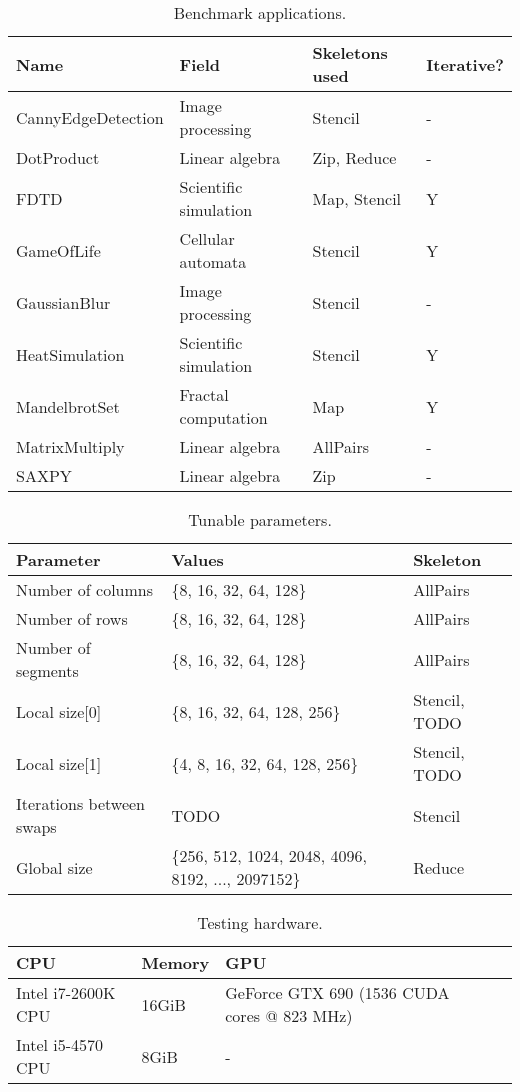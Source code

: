%

\begin{table}[h]
\centering
\begin{tabular}{| l | l | l | l |}
\hline
\textbf{Name} & \textbf{Field} & \textbf{Skeletons used} & \textbf{Iterative?}\\
\hline
CannyEdgeDetection & Image processing & Stencil & -\\
DotProduct & Linear algebra & Zip, Reduce & -\\
FDTD & Scientific simulation & Map, Stencil & Y\\
GameOfLife & Cellular automata & Stencil & Y\\
GaussianBlur & Image processing & Stencil & -\\
HeatSimulation & Scientific simulation & Stencil & Y\\
MandelbrotSet & Fractal computation & Map & Y\\
MatrixMultiply & Linear algebra & AllPairs & -\\
SAXPY & Linear algebra & Zip & -\\
\hline
\end{tabular}
\caption{Benchmark applications.}
\end{table}

\begin{table}[h]
\centering
\begin{tabular}{| l | l | l |}
\hline
\textbf{Parameter} & \textbf{Values} & \textbf{Skeleton}\\
\hline
Number of columns & \{8, 16, 32, 64, 128\} & AllPairs\\
Number of rows & \{8, 16, 32, 64, 128\} & AllPairs\\
Number of segments & \{8, 16, 32, 64, 128\} & AllPairs\\
Local size[0] & \{8, 16, 32, 64, 128, 256\} & Stencil, TODO\\
Local size[1] & \{4, 8, 16, 32, 64, 128, 256\} & Stencil, TODO\\
Iterations between swaps & TODO & Stencil\\
Global size & \{256, 512, 1024, 2048, 4096, 8192, ..., 2097152\} & Reduce\\
\hline
\end{tabular}
\caption{Tunable parameters.}
\end{table}

\begin{table}[h]
\centering
\begin{tabular}{| l | l | l | l |}
\hline
\textbf{CPU} & \textbf{Memory} & \textbf{GPU}\\
\hline
Intel i7-2600K CPU & 16GiB & GeForce GTX 690 (1536 CUDA cores @ 823 MHz)\\
Intel i5-4570 CPU & 8GiB & -\\
\hline
\end{tabular}
\caption{Testing hardware.}
\end{table}
